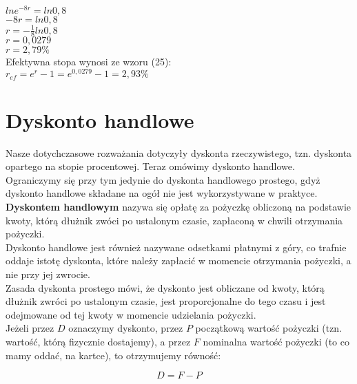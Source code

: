 \documentclass{article}
\begin{document}
$ ln e^{-8r} = ln0,8 $\\

$ -8r = ln 0,8 $\\

$ r = -\frac{1}{8} ln 0,8 $\\

$ r = 0,0279 $\\

$ r = 2,79\% $\\

Efektywna stopa wynosi ze wzoru (25):\\

$ r_{ef} = e^r - 1 = e ^ {0,0279} - 1 = 2,93\% $

\newpage

%
%

\section{Dyskonto handlowe}

Nasze dotychczasowe rozważania dotyczyły dyskonta rzeczywistego, tzn. dyskonta opartego na stopie procentowej. Teraz omówimy dyskonto handlowe. Ograniczymy się przy tym jedynie do dyskonta handlowego prostego, gdyż dyskonto handlowe składane na ogół nie jest wykorzystywane w praktyce. \\

\textbf{Dyskontem handlowym} nazywa się opłatę za pożyczkę obliczoną na podstawie kwoty, którą dłużnik zwóci po ustalonym czasie, zapłaconą w chwili otrzymania pożyczki.\\

Dyskonto handlowe jest również nazywane odsetkami płatnymi z góry, co trafnie oddaje istotę dyskonta, które należy zapłacić w momencie otrzymania pożyczki, a nie przy jej zwrocie.\\

Zasada dyskonta prostego mówi, że dyskonto jest obliczane od kwoty, którą dłużnik zwróci po ustalonym czasie, jest proporcjonalne do tego czasu i jest odejmowane od tej kwoty w momencie udzielania pożyczki.\\

Jeżeli przez $ D $ oznaczymy dyskonto, przez $ P $ początkową wartość pożyczki (tzn. wartość, którą fizycznie dostajemy), a przez $ F $ nominalna wartość pożyczki (to co mamy oddać, na kartce), to otrzymujemy równość:

\begin{center}
	\begin{equation}
		D = F - P
	\end{equation}
\end{center}\\
\end{document}
